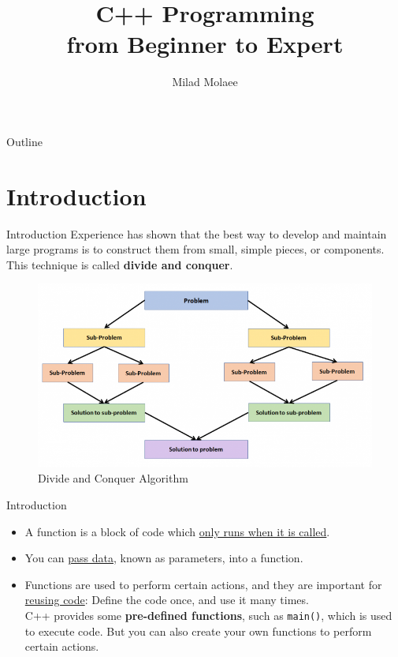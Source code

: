 \documentclass[10pt]{beamer}
\author[miladmolaee@hotmail.com]{\large Milad Molaee}
\title[C++ Programming]{C++ Programming\\\vspace{5pt}from Beginner to Expert\\\vspace{20pt}{\color{darkblue}\large Chapter 6: Functions and an Introduction to Recursion}}
\begin{document}
 
%
\frame{\titlepage}

%
\begin{frame}{Outline}
\footnotesize\tableofcontents
\end{frame}


\section{Introduction}
\begin{frame}{Introduction}
	\justifying
	Experience has shown that the best way to develop and maintain large programs is to construct them from small, simple pieces, or components. This technique is
	called \textbf{divide and conquer}.
	\\\vspace{10pt}
	\begin{center}
		\begin{figure}
			\includegraphics[width=0.7\linewidth]{./.images/.img-6-1.png}
			\caption{Divide and Conquer Algorithm}
		\end{figure}
	\end{center}
\end{frame}


\begin{frame}{Introduction}
	\justifying
	\begin{itemize}
		\setlength\itemsep{0.5em}
		\item [\color{purple}\blacksquare] A function is a block of code which \underline{only runs when it is called}.
		\item [\color{purple}\blacksquare] You can \underline{pass data}, known as parameters, into a function.
		\item [\color{purple}\blacksquare] Functions are used to perform certain actions, and they are important for \underline{reusing code}: Define the code once, and use it many times.
		\\\vspace{10pt}
		C++ provides some \textbf{pre-defined functions}, such as \texttt{\color{blue}main()}, which is used to execute code. But you can also create your own functions to perform certain actions.
		\\\vspace{8pt}
		
	\end{itemize}
\end{frame}
\end{document}
